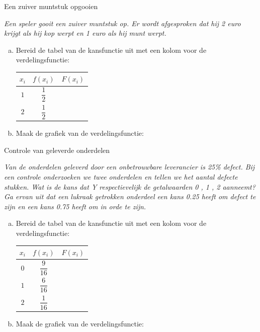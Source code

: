 \documentclass[12pt,twoside]{article}
\begin{document}
\begin{oefening}
Een zuiver muntstuk opgooien

{\em Een speler gooit een zuiver muntstuk op. Er wordt afgesproken dat hij 2 euro krijgt als hij kop werpt en 1 euro als hij munt werpt.}

\begin{enumerate}[(a)]
  \item Bereid de tabel van de kansfunctie uit met een kolom voor de verdelingsfunctie:
  \begin{center}
    \begin{tabular}{c|c|c}
      $x_i$ & $f(x_i)$ & $F(x_i)$\\
      \hline
      $1$ & $\dfrac{1}{2}$ &\\
      $2$ & $\dfrac{1}{2}$ &\\
    \end{tabular}
  \end{center}
  \item Maak de grafiek van de verdelingsfunctie:
  \begin{center}
  \end{center}
\end{enumerate}
\end{oefening}

\begin{oefening} Controle van geleverde onderdelen

{\em Van de onderdelen geleverd door een onbetrouwbare leverancier is 25\% defect. Bij een controle onderzoeken we twee onderdelen en tellen we het aantal defecte stukken. Wat is de kans dat Y respectievelijk de getalwaarden 0 , 1 , 2 aanneemt? Ga ervan uit dat een lukraak getrokken onderdeel een kans 0.25 heeft om defect te zijn en een kans 0.75 heeft om in orde te zijn.}

\begin{enumerate}[(a)]
  \item Bereid de tabel van de kansfunctie uit met een kolom voor de verdelingsfunctie:
  \begin{center}
    \begin{tabular}{c|c|c}
      $x_i$ & $f(x_i)$ & $F(x_i)$\\
      \hline
      $0$ & $\dfrac{9}{16}$ &\\
      $1$ & $\dfrac{6}{16}$ &\\
      $2$ & $\dfrac{1}{16}$ &\\
    \end{tabular}
  \end{center}
  \item Maak de grafiek van de verdelingsfunctie:
  \begin{center}
  \end{center}
\end{enumerate}
\end{oefening}
\end{document}
